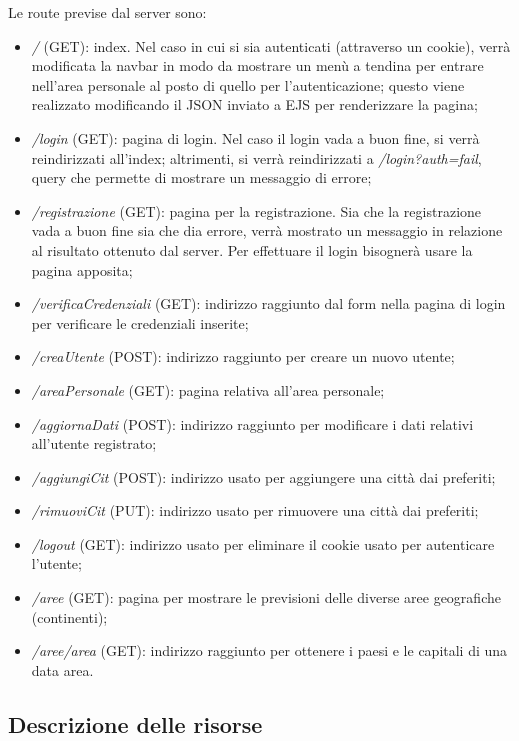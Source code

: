Le route previse dal server sono:
\begin{itemize}
      \item \emph{/} (GET): index. Nel caso in cui si sia autenticati (attraverso un cookie), verrà modificata la
            navbar in modo da mostrare un menù a tendina per entrare nell'area personale al posto di quello per l'autenticazione;
            questo viene realizzato modificando il JSON inviato a EJS per renderizzare la pagina;
      \item \emph{/login} (GET): pagina di login. Nel caso il login vada a buon fine, si verrà reindirizzati all'index; altrimenti,
            si verrà reindirizzati a \emph{/login?auth=fail}, query che permette di mostrare un messaggio di errore;
      \item \emph{/registrazione} (GET): pagina per la registrazione. Sia che la registrazione vada a buon fine sia che dia errore,
            verrà mostrato un messaggio in relazione al risultato ottenuto dal server. Per effettuare il login bisognerà usare la pagina
            apposita;
      \item \emph{/verificaCredenziali} (GET): indirizzo raggiunto dal form nella pagina di login per verificare le credenziali
            inserite;
      \item \emph{/creaUtente} (POST): indirizzo raggiunto per creare un nuovo utente;
      \item \emph{/areaPersonale} (GET): pagina relativa all'area personale;
      \item \emph{/aggiornaDati} (POST): indirizzo raggiunto per modificare i dati relativi all'utente registrato;
      \item \emph{/aggiungiCit} (POST): indirizzo usato per aggiungere una città dai preferiti;
      \item \emph{/rimuoviCit} (PUT): indirizzo usato per rimuovere una città dai preferiti;
      \item \emph{/logout} (GET): indirizzo usato per eliminare il cookie usato per autenticare l'utente;
      \item \emph{/aree} (GET): pagina per mostrare le previsioni delle diverse aree geografiche (continenti);
      \item \emph{/aree/area} (GET): indirizzo raggiunto per ottenere i paesi e le capitali di una data area.
\end{itemize}

\subsection{Descrizione delle risorse}

